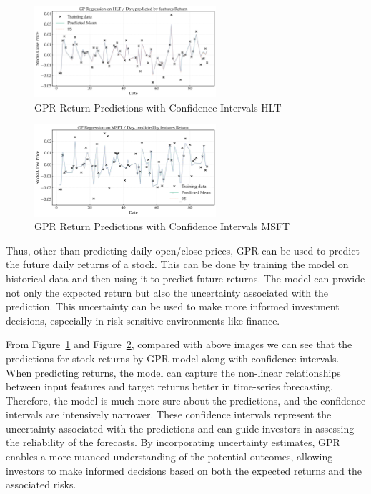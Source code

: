 \begin{figure}[htbp]
    \centering
    \includegraphics[width=0.6\textwidth]{figures/future_predictions_HLT_return.png}
    \caption{GPR Return Predictions with Confidence Intervals HLT}
    \label{fig:gpr_predictions_HLT}
\end{figure}

\begin{figure}[h]
    \centering
    \includegraphics[width=0.6\textwidth]{figures/future_predictions_MSFT_return.png}
    \caption{GPR Return Predictions with Confidence Intervals MSFT}
    \label{fig:gpr_predictions_MSFT}
\end{figure}

Thus, other than predicting daily open/close prices, GPR can be used to predict the future daily returns of a stock. This can be done by training the model on historical data and then using it to predict future returns. The model can provide not only the expected return but also the uncertainty associated with the prediction. This uncertainty can be used to make more informed investment decisions, especially in risk-sensitive environments like finance.

From Figure~\ref{fig:gpr_predictions_HLT} and Figure~\ref{fig:gpr_predictions_MSFT}, compared with above images we can see that the predictions for stock returns by GPR model along with confidence intervals. When predicting returns, the model can capture the non-linear relationships between input features and target returns better in time-series forecasting. Therefore, the model is much more sure about the predictions, and the confidence intervals are intensively narrower.
These confidence intervals represent the uncertainty associated with the predictions and can guide investors in assessing the reliability of the forecasts. By incorporating uncertainty estimates, GPR enables a more nuanced understanding of the potential outcomes, allowing investors to make informed decisions based on both the expected returns and the associated risks.
